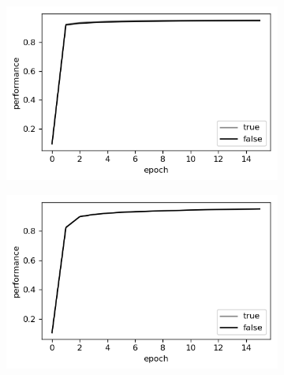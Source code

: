 \documentclass{article}
\begin{document}
\begin{figure}[h]
	\centering
	\begin{subfigure}[t]{0.32\linewidth}
		\centering
		\includegraphics[width = 1.0\linewidth, trim={5 5 5 5}, clip=true]{figures/bias_tanh.png}
		\subcaption{}
		\label{fig:biastanh}	
	\end{subfigure}%
	\hspace{0.01 \linewidth}
	\begin{subfigure}[t]{0.32\linewidth}
		\centering
		\includegraphics[width = 1.0\linewidth, trim={5 5 5 5}, clip=true]{figures/test_bias_sigmoid.png}
		\subcaption{}	
		\label{fig:biassigmoid}
	\end{subfigure}%
	\hspace{0.01 \linewidth}
	\begin{subfigure}[t]{0.32\linewidth}
		\centering

\end{subfigure}
\end{figure}
\end{document}
